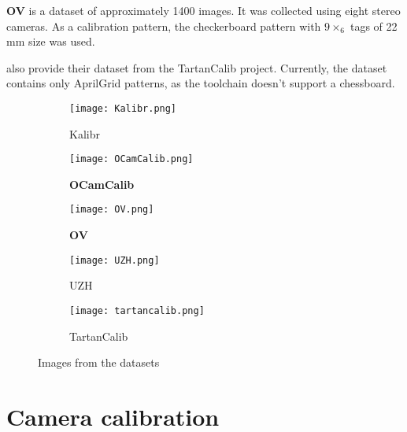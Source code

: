 \textbf{OV} \citep{lochmanBabelCalibUniversalApproach2021} is a dataset of
approximately 1400 images. It was collected using eight stereo cameras.
As a calibration pattern, the checkerboard pattern with \(9\times_6\) tags of 22 mm size
was used.

\textcite{duisterhofTartanCalibIterativeWideAngle2022} also provide their
dataset from the TartanCalib project. Currently, the dataset contains only
AprilGrid patterns, as the toolchain doesn't support a chessboard.

\begin{figure}[h]
	\centering
	\begin{subfigure}[b]{0.3\linewidth}
		\texttt{[image: Kalibr.png]}
		\caption{Kalibr}
	\end{subfigure}
	\hfill
	\begin{subfigure}[b]{0.3\linewidth}
		\texttt{[image: OCamCalib.png]}
		\caption{\textbf{OCamCalib}}
	\end{subfigure}
	\hfill
	\begin{subfigure}[b]{0.3\linewidth}
		\texttt{[image: OV.png]}
		\caption{\textbf{OV}}
	\end{subfigure}
	\begin{subfigure}[b]{0.3\linewidth}
		\texttt{[image: UZH.png]}
		\caption{UZH}
	\end{subfigure}
	\begin{subfigure}[b]{0.3\linewidth}
		\texttt{[image: tartancalib.png]}
		\caption{TartanCalib}
	\end{subfigure}
	\caption{Images from the datasets}
\end{figure}

\section{Camera calibration}\label{sec:camera_calibration_exp}

